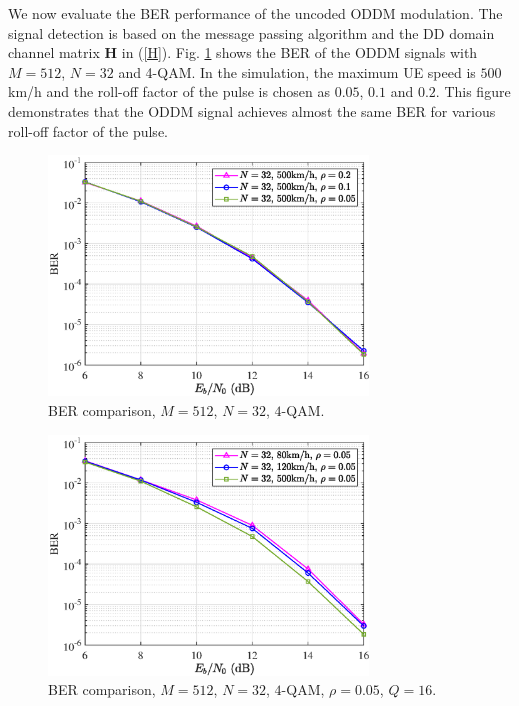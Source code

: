 \documentclass[journal]{IEEEtran}
\begin{document}
{We now evaluate the BER performance of the uncoded ODDM modulation.
The signal detection is based on the message passing algorithm \cite{viterbo_twc_2018} and the DD domain channel matrix $\mathbf H$ in (\ref{H}).
Fig. \ref{ber_N32_S500_rho} shows the BER of the ODDM signals with $M=512$, $N=32$ and 4-QAM. In the simulation, the maximum UE speed is $500$km/h and the roll-off factor of the pulse is chosen as $0.05$, $0.1$ and $0.2$. This figure demonstrates that the ODDM signal achieves almost the same BER for various roll-off factor of the pulse.

\begin{figure}
  \centering
  \includegraphics[width=8.5cm]{ber_vs_rho.eps}
  \caption{BER comparison, $M=512$, $N=32$, $4$-QAM.}
  \label{ber_N32_S500_rho}
\end{figure}

\begin{figure}
  \centering
  \includegraphics[width=8.5cm]{ber_vs_speed.eps}
  \caption{BER comparison, $M=512$, $N=32$, $4$-QAM, $\rho=0.05$, $Q=16$.}
  \label{ber_N32_rho01_q12_S}
  \vspace*{-3.2mm}
\end{figure}

}
\end{document}
